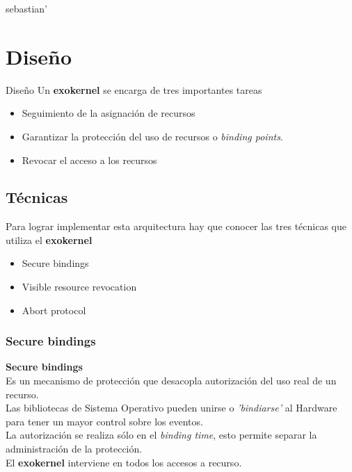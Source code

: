 sebastian'\]\documentclass[10pt]{beamer}
\begin{document}
\section{Diseño}
\begin{frame}{Diseño}
Un \textbf{exokernel} se encarga de tres importantes tareas

\begin{itemize}
  \item Seguimiento de la asignación de recursos
  \item Garantizar la protección del uso de recursos o \textit{binding points}.
  \item Revocar el acceso a los recursos
\end{itemize}

\end{frame}


\subsection{Técnicas}
\begin{frame}
Para lograr implementar esta arquitectura hay que conocer las tres técnicas que utiliza el \textbf{exokernel} 

\begin{itemize}
  \item Secure bindings
  \item Visible resource revocation
  \item Abort protocol
\end{itemize}
\end{frame}


\subsubsection{Secure bindings}

\begin{frame}
\textbf{Secure bindings} \\[2em]

Es un mecanismo de protección que desacopla autorización del uso real de un recurso.\\[1em]

Las bibliotecas de Sistema Operativo pueden unirse o \textit{'bindiarse'} al Hardware para tener un mayor control sobre los eventos. \\[1em]  
La autorización se realiza sólo en el \textit{binding time}, esto permite separar la administración de la protección.\\[1em]

El \textbf{exokernel} interviene en todos los accesos a recurso.

\end{frame}
\end{document}
